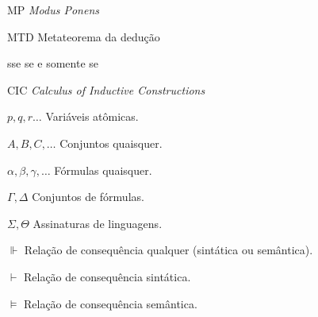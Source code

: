 



\listoftables*
\cleardoublepage

\begin{siglas}
	\item[MP] \textit{Modus Ponens}
	\item[MTD] Metateorema da dedução
	\item[sse] se e somente se
	\item[CIC] \textit{Calculus of Inductive Constructions}
\end{siglas}

\begin{simbolos}
    \item [$p, q, r\ldots$] Variáveis atômicas.
    \item [$A, B, C, \ldots$] Conjuntos quaisquer.
    \item [$\alpha, \beta, \gamma, \ldots$] Fórmulas quaisquer.
    \item [$\Gamma, \Delta$] Conjuntos de fórmulas.
    \item [$\Sigma, \Theta$] Assinaturas de linguagens.
    \item[$\Vdash$] Relação de consequência qualquer (sintática ou semântica).
    \item[$\vdash$] Relação de consequência sintática.
    \item[$\vDash$] Relação de consequência semântica.
\end{simbolos}


